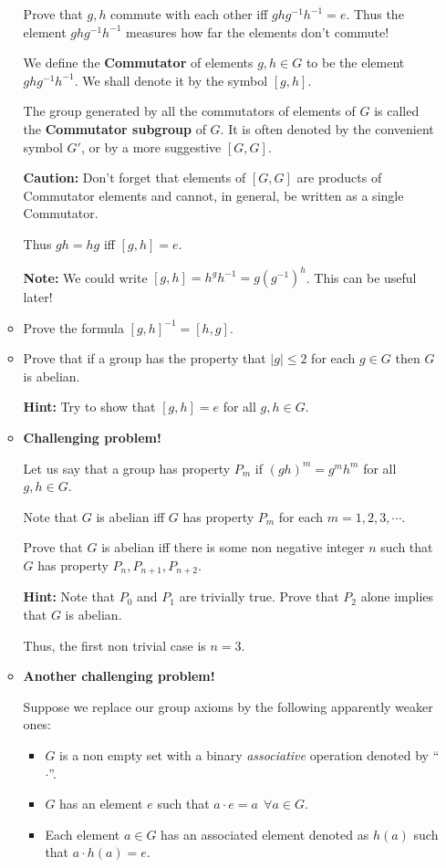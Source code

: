 \documentclass[12pt]{article}
\begin{document}
\begin{enumerate}
\begin{itemize}
Prove that $g,h$ commute with each other iff $ghg^{-1}h^{-1}=e$.
Thus the element $ghg^{-1}h^{-1}$ measures how far the elements don't commute!

We define the {\bf Commutator } of elements $g,h\in G$ to be the
element $ghg^{-1}h^{-1}$. We shall denote it by the symbol $[g,h]$.

The group generated by all the commutators of elements of $G$ 
is called the {\bf Commutator subgroup} of $G$.
It is often denoted by the convenient symbol $G'$, or by a more
suggestive $[G,G]$.

{\bf Caution:} Don't forget that elements of $[G,G]$ are products of
Commutator elements and cannot, in general, be written as a single
Commutator.

Thus $gh=hg$ iff $[g,h]=e$.

{\bf Note:} We could write $[g,h]=h^gh^{-1} = g(g^{-1})^h$. This can be useful
later!

\item Prove the formula $[g,h]^{-1} = [h,g]$.
\item Prove that if a group has the property that $|g|\leq 2 $ for each
$g\in G$ then $G$ is abelian.

{\bf Hint:} Try to show that $[g,h]=e$ for
all $g,h\in G$.

\item {\bf Challenging problem!}

Let us say that a group has property $P_m$ if $(gh)^m = g^mh^m$
for all $g,h\in G$.

Note that $G$ is abelian iff $G$ has property $P_m$ for each
$m=1,2,3,\cdots$.

Prove that $G$ is abelian iff there is some non negative integer $n$
such that $G$ has property $P_n,P_{n+1},P_{n+2}$.

{\bf Hint:} Note that $P_0$ and $P_1$ are trivially true.
Prove that $P_2$ alone implies that $G$ is abelian.

Thus, the first non trivial case is $n=3$.

\item {\bf Another challenging problem!}

Suppose we replace our group axioms by the following apparently weaker
ones:
\begin{itemize}
\item $G$ is a non empty set with a binary {\it associative} 
operation denoted by
``$\cdot$''.
\item $G$ has an element $e$ such that $a\cdot e =a ~~\forall a\in G$.
\item Each element $a\in G$ has an associated element denoted as $h(a)$
such that $a\cdot h(a) = e$.
\end{itemize}


\end{itemize}
\end{enumerate}
\end{document}
